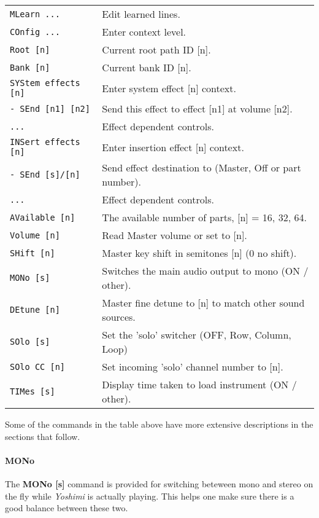 \begin{center}
\begin{longtable}{p{6cm} p{10cm}}
\texttt{MLearn ...} &
   Edit learned lines. \\
\texttt{COnfig ...} &
   Enter context level. \\
\texttt{Root [n]} &
   Current root path ID [n]. \\
\texttt{Bank [n]} &
   Current bank ID [n]. \\
\texttt{SYStem effects [n]} &
   Enter system effect [n] context. \\
\texttt{- SEnd [n1] [n2]} &
   Send this effect to effect [n1] at volume [n2]. \\
\texttt{...} &
   Effect dependent controls. \\
\texttt{INSert effects [n]} &
   Enter insertion effect [n] context. \\
\texttt{- SEnd [s]/[n]} &
   Send effect destination to (Master, Off or part number). \\
\texttt{...} &
   Effect dependent controls. \\
\texttt{AVailable [n]} &
   The available number of parts, [n] = 16, 32, 64. \\
\texttt{Volume [n]} &
   Read Master volume or set to [n]. \\
\texttt{SHift [n]} &
   Master key shift in semitones [n] (0 no shift). \\
\texttt{MONo [s]} &
   Switches the main audio output to mono (ON / other). \\
\texttt{DEtune [n]} &
   Master fine detune to [n] to match other sound sources. \\
\texttt{SOlo [s]} &
   Set the 'solo' switcher (OFF, Row, Column, Loop) \\
\texttt{SOlo CC [n]} &
   Set incoming 'solo' channel number to [n]. \\
\texttt{TIMes [s]} &
   Display time taken to load instrument (ON / other). \\

\end{longtable}
\end{center}


   Some of the commands in the table above have more extensive descriptions in
   the sections that follow.

\paragraph{MONo}
\label{paragraph:command_line_mono}
    The \textbf{MONo [s]} command is provided for switching beteween mono and
    stereo on the fly while \textsl{Yoshimi} is actually playing. This helps
    one make sure there is a good balance between these two.

